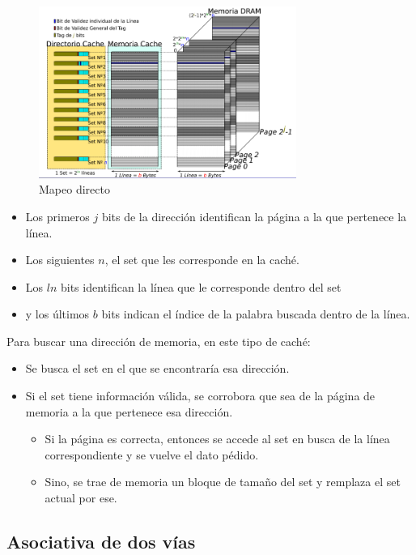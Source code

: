 \begin{figure}[ht]
	\centering
	\includegraphics[width=0.75\textwidth]{imagenes/cache-mapeo-directo}
	\caption{Mapeo directo}
	\label{fig:direct-mapping}
\end{figure}
\begin{itemize}
	\item Los primeros $j$ bits de la dirección identifican la página a la que pertenece la línea.
	\item Los siguientes $n$, el set que les corresponde en la caché.
	\item Los $ln$ bits identifican la línea que le corresponde dentro del set
	\item y los últimos $b$ bits indican el índice de la palabra buscada dentro de la línea.
\end{itemize}

Para  buscar una dirección de memoria, en este tipo de caché:

\begin{itemize}
	\item Se busca el set en el que se encontraría esa dirección.
	\item Si el set tiene información válida, se corrobora que sea de la página de memoria a la que pertenece esa dirección.
	\begin{itemize}
		\item Si la página es correcta, entonces se accede al set en busca de la línea correspondiente y se vuelve el dato pédido.
		\item Sino, se trae de memoria un bloque de tamaño del set y remplaza el set actual por ese.
	\end{itemize}
\end{itemize}

\subsection{Asociativa de dos vías}

